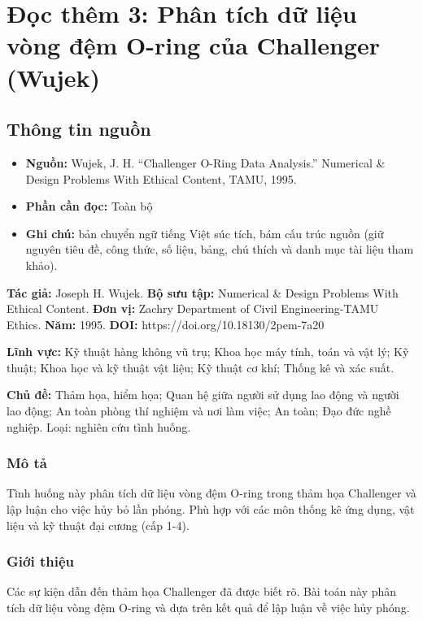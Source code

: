 \chapter{Đọc thêm 3: Phân tích dữ liệu vòng đệm O-ring của Challenger (Wujek)}
\label{ch:M6L4DocThem3}

\section{Thông tin nguồn}

\begin{itemize}
  \item \textbf{Nguồn:} Wujek, J. H. ``Challenger O-Ring Data Analysis.'' Numerical \& Design Problems With Ethical Content, TAMU, 1995.
  \item \textbf{Phần cần đọc:} Toàn bộ
  \item \textbf{Ghi chú:} bản chuyển ngữ tiếng Việt súc tích, bám cấu trúc nguồn (giữ nguyên tiêu đề, công thức, số liệu, bảng, chú thích và danh mục tài liệu tham khảo).
\end{itemize}

\textbf{Tác giả:} Joseph H. Wujek. \textbf{Bộ sưu tập:} Numerical \& Design Problems With Ethical Content. \textbf{Đơn vị:} Zachry Department of Civil Engineering-TAMU Ethics. \textbf{Năm:} 1995. \textbf{DOI:} https://doi.org/10.18130/2pem-7a20

\textbf{Lĩnh vực:} Kỹ thuật hàng không vũ trụ; Khoa học máy tính, toán và vật lý; Kỹ thuật; Khoa học và kỹ thuật vật liệu; Kỹ thuật cơ khí; Thống kê và xác suất.

\textbf{Chủ đề:} Thảm họa, hiểm họa; Quan hệ giữa người sử dụng lao động và người lao động; An toàn phòng thí nghiệm và nơi làm việc; An toàn; Đạo đức nghề nghiệp. Loại: nghiên cứu tình huống.

\subsection{Mô tả}

Tình huống này phân tích dữ liệu vòng đệm O-ring trong thảm họa Challenger và lập luận cho việc hủy bỏ lần phóng. Phù hợp với các môn thống kê ứng dụng, vật liệu và kỹ thuật đại cương (cấp 1-4).

\subsection{Giới thiệu}

Các sự kiện dẫn đến thảm họa Challenger đã được biết rõ. Bài toán này phân tích dữ liệu vòng đệm O-ring và dựa trên kết quả để lập luận về việc hủy phóng.

